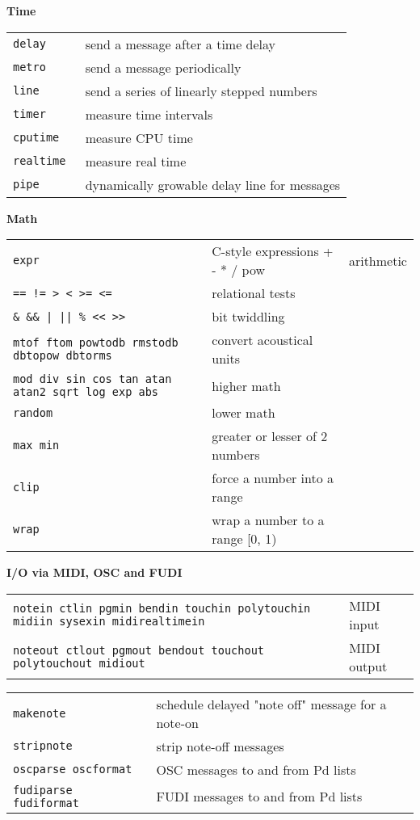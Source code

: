 \documentclass[a4paper, landscape, 10pt]{article}
\newcommand{\refcardtitle}[1]{
  \begin{center}
    \textbf{\small{#1}}
  \end{center}
}
\begin{document}
\begin{multicols}{3}
  \refcardtitle{Time}
  \begin{tabularx}{9cm}{>{\tt}l X}
    delay & send a message after a time delay \\
    metro & send a message periodically \\
    line & send a series of linearly stepped numbers \\
    timer & measure time intervals \\
    cputime & measure CPU time \\
    realtime & measure real time \\
    pipe & dynamically growable delay line for messages \\
  \end{tabularx}

  \refcardtitle{Math}
  \begin{tabularx}{9cm}{>{\tt}X X}
  	expr & C-style expressions
    + - * / pow  & arithmetic \\
    == != > < >= <= & relational tests \\
    \& \&\& | || \% << >> & bit twiddling \\
    mtof ftom powtodb rmstodb dbtopow dbtorms & convert acoustical units \\
    mod div sin cos tan atan atan2 sqrt log exp abs & higher math \\
    random & lower math \\ 
    max min & greater or lesser of 2 numbers \\
    clip & force a number into a range \\
    wrap & wrap a number to a range [0, 1)
  \end{tabularx}

  \refcardtitle{I/O via MIDI, OSC and FUDI}
  \begin{tabularx}{9cm}{>{\tt}X l}
    notein ctlin pgmin bendin touchin polytouchin midiin sysexin midirealtimein & MIDI input \\
    noteout ctlout pgmout bendout touchout polytouchout midiout & MIDI output \\
  \end{tabularx}
  \begin{tabularx}{9cm}{>{\tt}l X}
    makenote & schedule delayed "note off" message for a note-on \\
    stripnote & strip note-off messages \\
    oscparse oscformat & OSC messages to and from Pd lists \\
    fudiparse fudiformat & FUDI messages to and from Pd lists \\
  \end{tabularx}


\end{multicols}
\end{document}

